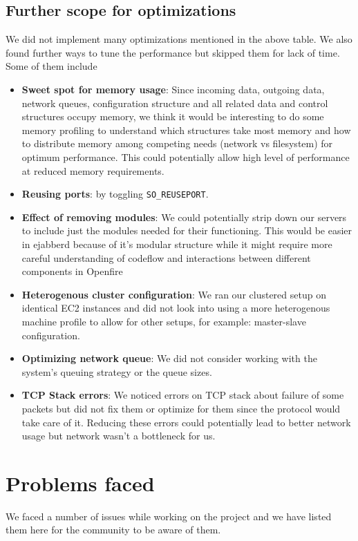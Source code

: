 \documentclass[a4paper, twocolumn]{article}
\begin{document}
\subsection{Further scope for optimizations}
We did not implement many optimizations mentioned in the above table. We also found further ways to tune the performance but skipped them for lack of time. Some of them include
\begin{itemize}
\item \textbf{Sweet spot for memory usage}: Since incoming data, outgoing data, network queues, configuration structure and all related data and control structures occupy memory, we think it would be interesting to do some memory profiling to understand which structures take most memory and how to distribute memory among competing needs (network vs filesystem) for optimum performance. This could potentially allow high level of performance at reduced memory requirements. 
\item \textbf{Reusing ports}: by toggling \texttt{SO\_REUSEPORT}.
\item \textbf{Effect of removing modules}: We could potentially strip down our servers to include just the modules needed for their functioning. This would be easier in ejabberd because of it's modular structure while it might require more careful understanding of codeflow and interactions between different components in Openfire
\item \textbf{Heterogenous cluster configuration}: We ran our clustered setup on identical EC2 instances and did not look into using a more heterogenous machine profile to allow for other setups, for example: master-slave configuration.
\item \textbf{Optimizing network queue}: We did not consider working with the system's queuing strategy or the queue sizes. 
\item \textbf{TCP Stack errors}: We noticed errors on TCP stack about failure of some packets but did not fix them or optimize for them since the protocol would take care of it.  Reducing these errors could potentially lead to better network usage but network wasn't a bottleneck for us. 
\end{itemize}


\section{Problems faced}
We faced a number of issues while working on the project and we have listed them here for the community to be aware of them. 
\end{document}
